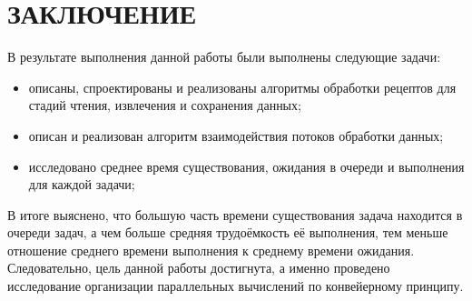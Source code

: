 \chapter*{ЗАКЛЮЧЕНИЕ}

В результате выполнения данной работы были выполнены следующие задачи:
\begin{itemize}
    \item описаны, спроектированы и реализованы алгоритмы обработки рецептов для стадий чтения, извлечения и сохранения данных;

    \item описан и реализован алгоритм взаимодействия потоков обработки данных;
    
    \item исследовано среднее время существования, ожидания в очереди и выполнения для каждой задачи;
\end{itemize}
В итоге выяснено, что большую часть времени существования задача находится в очереди задач, а чем больше средняя трудоёмкость её выполнения, тем меньше отношение среднего времени выполнения к среднему времени ожидания.
Следовательно, цель данной работы достигнута, а именно проведено исследование организации параллельных вычислений по конвейерному принципу.